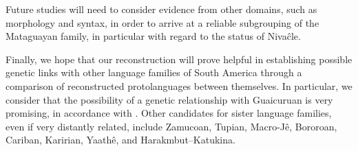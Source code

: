 Future studies will need to consider evidence from other domains, such as morphology and syntax, in order to arrive at a reliable subgrouping of the Mataguayan family, in particular with regard to the status of Nivaĉle.

Finally, we hope that our reconstruction will prove helpful in establishing possible genetic links with other language families of South America through a comparison of reconstructed protolanguages between themselves. In particular, we consider that the possibility of a genetic relationship with Guaicuruan is very promising, in accordance with \citet{PVB93,PVB13a}. Other candidates for sister language families, even if very distantly related, include Zamucoan, Tupian, Macro-Jê, Bororoan, Cariban, Karirian, Yaathê, and Harakmbut--Katukina.